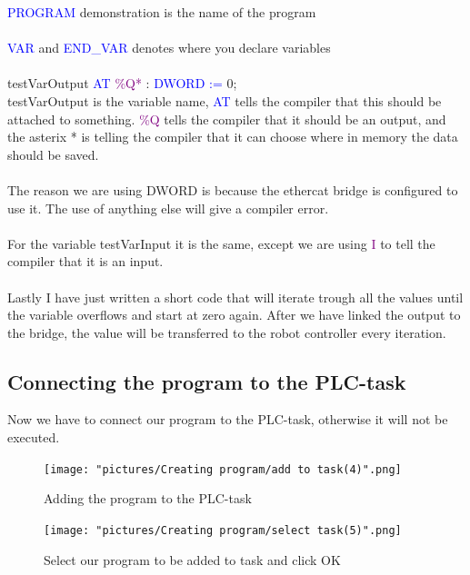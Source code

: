 \documentclass{article}
\begin{document}
\noindent
\textcolor{blue}{PROGRAM}  demonstration is the name of the program
\\\\
\textcolor{blue}{VAR} and \textcolor{blue}{END\_VAR} denotes where you declare variables
\\\\
testVarOutput \textcolor{blue}{AT} \textcolor{purple}{\%Q*} : \textcolor{blue}{DWORD :=} 0;
\\
testVarOutput is the variable name, \textcolor{blue}{AT} tells the compiler that this should be attached to something. \textcolor{purple}{\%Q} tells the compiler that it should be an output, and the asterix * is telling the compiler that it can choose where in memory the data should be saved.    
\\\\
The reason we are using DWORD is because the ethercat bridge is configured to use it. The use of anything else will give a compiler error. 
\\\\
For the variable testVarInput it is the same, except we are using \textcolor{purple}{I} to tell the compiler that it is an input.
\\\\
Lastly I have just written a short code that will iterate trough all the values until the variable overflows and start at zero again. After we have linked the output to the bridge, the value will be transferred to the robot controller every iteration.

\subsection{Connecting the program to the PLC-task}

 Now we have to connect our program to the PLC-task, otherwise it will not be executed. 
 
 \begin{figure}[!h]
     \centering
     \texttt{[image: "pictures/Creating program/add to task(4)".png]}
     \caption{Adding the program to the PLC-task}
     \label{fig:my_label}
 \end{figure}

\begin{figure}[!h]
    \centering
    \texttt{[image: "pictures/Creating program/select task(5)".png]}
    \caption{Select our program to be added to task and click OK}
    \label{fig:my_label}
\end{figure}
\end{document}
